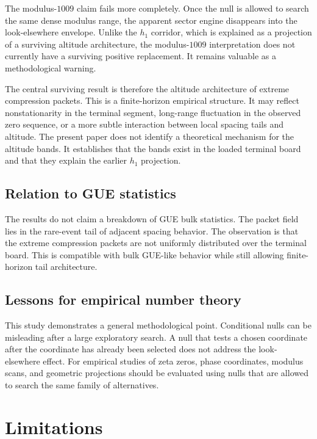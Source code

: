 \documentclass[11pt]{article}
\begin{document}
The modulus-\(1009\) claim fails more completely. Once the null is allowed to search the same dense modulus range, the apparent sector engine disappears into the look-elsewhere envelope. Unlike the \(h_1\) corridor, which is explained as a projection of a surviving altitude architecture, the modulus-\(1009\) interpretation does not currently have a surviving positive replacement. It remains valuable as a methodological warning.

The central surviving result is therefore the altitude architecture of extreme compression packets. This is a finite-horizon empirical structure. It may reflect nonstationarity in the terminal segment, long-range fluctuation in the observed zero sequence, or a more subtle interaction between local spacing tails and altitude. The present paper does not identify a theoretical mechanism for the altitude bands. It establishes that the bands exist in the loaded terminal board and that they explain the earlier \(h_1\) projection.

\subsection{Relation to GUE statistics}

The results do not claim a breakdown of GUE bulk statistics. The packet field lies in the rare-event tail of adjacent spacing behavior. The observation is that the extreme compression packets are not uniformly distributed over the terminal board. This is compatible with bulk GUE-like behavior while still allowing finite-horizon tail architecture.

\subsection{Lessons for empirical number theory}

This study demonstrates a general methodological point. Conditional nulls can be misleading after a large exploratory search. A null that tests a chosen coordinate after the coordinate has already been selected does not address the look-elsewhere effect. For empirical studies of zeta zeros, phase coordinates, modulus scans, and geometric projections should be evaluated using nulls that are allowed to search the same family of alternatives.

\section{Limitations}
\end{document}
